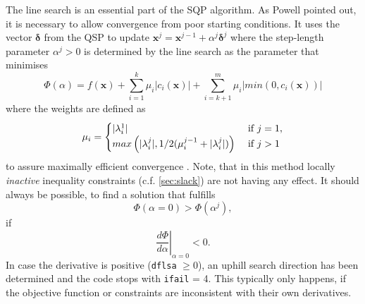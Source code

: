 \documentclass[11pt,a4paper]{report}
\newcommand{\ifail}{\mbox{\texttt{ifail}}}
\renewcommand{\vec}[1]{\boldsymbol{#1}}
\begin{document}
The line search is an essential part of the SQP algorithm. As Powell
\cite{Powell1978} pointed out, it is necessary to allow convergence from poor
starting conditions. It uses the vector $\vec{\delta}$ from the QSP to update
$\vec{x}^j = \vec{x}^{j-1} + \alpha^j \vec{\delta}^j$ where the step-length
parameter $\alpha^j>0$ is determined by the line search as the parameter that
minimises
\begin{equation}
\Phi(\alpha) = f(\vec{x}) + \sum_{i=1}^k \mu_i \left| c_i(\vec{x})\right| +
\sum_{i=k+1}^m \mu_i \left| min(0,c_i(\vec{x}))\right|
\end{equation}
where the weights are defined as
\begin{equation}
\mu_i = 
\begin{cases}
|\lambda_i^1| & \textnormal{ if } j = 1,\\
max\left(|\lambda_i^j|,1/2(\mu_i^{j-1} + |\lambda_i^j|)\right) & \textnormal{ if } j > 1
\end{cases}
\end{equation}
to assure maximally efficient convergence \cite{Han1975}. Note, that in this
method locally {\it inactive} inequality constraints (c.f. \ref{sec:slack})
are not having any effect. It should always be possible, to find a solution
that fulfills
\begin{equation}
\Phi(\alpha=0)> \Phi(\alpha^j),
\end{equation}
if 
\begin{equation}
\left. \frac{d \Phi}{d\alpha}\right|_{\alpha=0} < 0.
\end{equation}
In case the derivative is positive (\texttt{dflsa} $\geq 0$), an uphill search
direction has been determined and the code stops with \ifail\/ =
4. %
This typically only happens, if the objective function or constraints are
inconsistent with their own derivatives.
\end{document}
